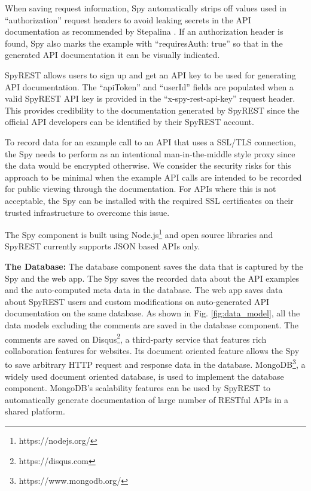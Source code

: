 \documentclass[conference]{IEEEtran}
\begin{document}
When saving request information, Spy automatically strips off values used in ``authorization'' request headers to avoid leaking secrets in the API documentation as recommended by Stepalina \cite{Stepalina_saas}. If an authorization header is found, Spy also marks the example with ``requiresAuth: true'' so that in the generated API documentation it can be visually indicated.

SpyREST allows users to sign up and get an API key to be used for generating API documentation. The ``apiToken'' and ``userId'' fields are populated when a valid SpyREST API key is provided in the ``x-spy-rest-api-key'' request header. This provides credibility to the documentation generated by SpyREST since the official API developers can be identified by their SpyREST account.

To record data for an example call to an API that uses a SSL/TLS connection, the Spy needs to perform as an intentional man-in-the-middle style proxy since the data would be encrypted otherwise. We consider the security risks for this approach to be minimal when the example API calls are intended to be recorded for public viewing through the documentation. For APIs where this is not acceptable, the Spy can be installed with the required SSL certificates on their trusted infrastructure to overcome this issue.

The Spy component is built using Node.js\footnote{https://nodejs.org/} and open source libraries and SpyREST currently supports JSON based APIs only.

\textbf{The Database:} The database component saves the data that is captured by the Spy and the web app. The Spy saves the recorded data about the API examples and the auto-computed meta data in the database. The web app saves data about SpyREST users and custom modifications on auto-generated API documentation on the same database. As shown in Fig. \ref{fig:data_model}, all the data models excluding the comments are saved in the database component. The comments are saved on Disqus\footnote{https://disqus.com}, a third-party service that features rich collaboration features for websites. Its document oriented feature allows the Spy to save arbitrary HTTP request and response data in the database. MongoDB\footnote{https://www.mongodb.org/}, a widely used document oriented database, is used to implement the database component. MongoDB's scalability features can be used by SpyREST to automatically generate documentation of large number of RESTful APIs in a shared platform.
\end{document}
